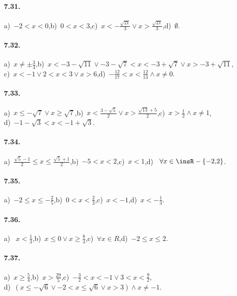 \paragraph{7.31.} a)~$ -2<x<0 $,\quad b)~$ 0<x<3 $,\quad c)~$x<-\frac{\sqrt{21}} 3\vee x>\frac{\sqrt{21}} 3$,\quad d)~$\emptyset $.

\paragraph{7.32.} a)~$x\neq \pm \frac 3 4$,\quad b)~$x<-3-\sqrt{11}\vee -3-\sqrt 7<x<-3+\sqrt 7\vee x>-3+\sqrt{11}$,\protect\\
\quad c)~$x<-1\vee 2<x<3\vee x>6$,\quad d)~$-\frac{12}{17}<x<\frac{12}{13}\wedge x\neq 0$.

\paragraph{7.33.} a)~$x\le -\sqrt 7\vee x\ge \sqrt 7$,\quad b)~$x<\frac{3-\sqrt 5} 2\vee x>\frac{\sqrt{13}+5} 2$,\quad c)~$x>\frac 1 2\wedge x\neq 1$,\protect\\
\quad d)~$-1-\sqrt 3<x<-1+\sqrt 3$.

\paragraph{7.34.} a)~$\frac{\sqrt 5-1} 2\le x\le \frac{\sqrt 5+1} 2$,\quad b)~$-5<x<2$,\quad c)~$x<1$,\quad d)~ $ \forall x \in \insR -\{-2\text{,}2\} $.

\paragraph{7.35.} a)~$-2\le x\le -\frac 2 5$,\quad b)~$0<x<\frac 2 3$,\quad c)~$x<-1$,\quad d)~$x<-\frac 1 3$.

\paragraph{7.36.} a)~ $x<\frac 1 3$,\quad b)~$x\le 0\vee x\ge \frac 8 3$,\quad c)~$\forall x\in R$,\quad d)~$-2\le x\le 2$.

\paragraph{7.37.} a)~$x\ge \frac 5 4$,\quad b)~$x>\frac{29} 5$,\quad c)~$-\frac 3 2<x<-1\vee 3<x<\frac 9 2$,\protect\\
\quad d)~$(x\le -\sqrt 6\vee -2<x\le \sqrt 6\vee x>3)\wedge x\neq -1$.
